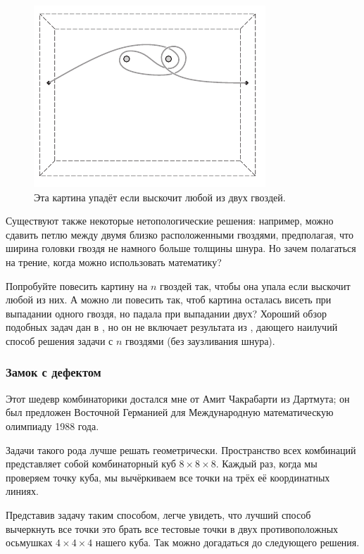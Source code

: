 \begin{figure}[h!]
\centering
\includegraphics[scale=1]{pics/kartina2}
\caption{Эта картина упадёт если выскочит любой из двух гвоздей.}
\label{pic:kartina2}
\end{figure}

Существуют также некоторые нетопологические решения: например, можно сдавить петлю между двумя близко расположенными гвоздями, предполагая, что ширина головки гвоздя не намного больше толщины шнура.
Но зачем полагаться на трение, когда можно использовать математику?

\begin{addedbytheeditors}
Попробуйте повесить картину на $n$ гвоздей так, чтобы она упала если выскочит любой из них.
А можно ли повесить так, чтоб картина осталась висеть при выпадании одного гвоздя, но падала при выпадании двух?
Хороший обзор подобных задач дан в \cite{demaine2014}, но он не включает результата из \cite{gartside-greenwood}, дающего наилучий способ решения задачи с $n$ гвоздями (без заузливания шнура).
\end{addedbytheeditors}

\subsubsection*{Замок с дефектом}

Этот шедевр комбинаторики достался мне от Амит Чакрабарти из Дартмута;
он был предложен Восточной Германией для Международную математическую олимпиаду 1988 года.

Задачи такого рода лучше решать геометрически.
Пространство всех комбинаций представляет собой комбинаторный куб $8 \times 8 \times 8$.
Каждый раз, когда мы проверяем точку куба, мы вычёркиваем все точки на трёх её координатных линиях.

Представив задачу таким способом, легче увидеть, что лучший способ вычеркнуть все точки это брать все тестовые точки в двух противоположных осьмушках $4 \times 4 \times 4$ нашего куба.
Так можно догадаться до следующего решения.

